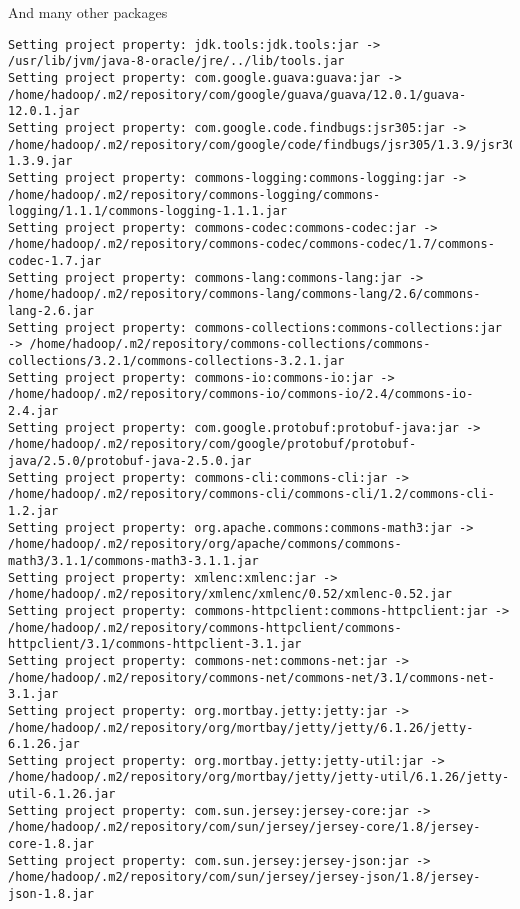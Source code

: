 And many other packages
\begin{verbatim}
Setting project property: jdk.tools:jdk.tools:jar -> /usr/lib/jvm/java-8-oracle/jre/../lib/tools.jar
Setting project property: com.google.guava:guava:jar -> /home/hadoop/.m2/repository/com/google/guava/guava/12.0.1/guava-12.0.1.jar
Setting project property: com.google.code.findbugs:jsr305:jar -> /home/hadoop/.m2/repository/com/google/code/findbugs/jsr305/1.3.9/jsr305-1.3.9.jar
Setting project property: commons-logging:commons-logging:jar -> /home/hadoop/.m2/repository/commons-logging/commons-logging/1.1.1/commons-logging-1.1.1.jar
Setting project property: commons-codec:commons-codec:jar -> /home/hadoop/.m2/repository/commons-codec/commons-codec/1.7/commons-codec-1.7.jar
Setting project property: commons-lang:commons-lang:jar -> /home/hadoop/.m2/repository/commons-lang/commons-lang/2.6/commons-lang-2.6.jar
Setting project property: commons-collections:commons-collections:jar -> /home/hadoop/.m2/repository/commons-collections/commons-collections/3.2.1/commons-collections-3.2.1.jar
Setting project property: commons-io:commons-io:jar -> /home/hadoop/.m2/repository/commons-io/commons-io/2.4/commons-io-2.4.jar
Setting project property: com.google.protobuf:protobuf-java:jar -> /home/hadoop/.m2/repository/com/google/protobuf/protobuf-java/2.5.0/protobuf-java-2.5.0.jar
Setting project property: commons-cli:commons-cli:jar -> /home/hadoop/.m2/repository/commons-cli/commons-cli/1.2/commons-cli-1.2.jar
Setting project property: org.apache.commons:commons-math3:jar -> /home/hadoop/.m2/repository/org/apache/commons/commons-math3/3.1.1/commons-math3-3.1.1.jar
Setting project property: xmlenc:xmlenc:jar -> /home/hadoop/.m2/repository/xmlenc/xmlenc/0.52/xmlenc-0.52.jar
Setting project property: commons-httpclient:commons-httpclient:jar -> /home/hadoop/.m2/repository/commons-httpclient/commons-httpclient/3.1/commons-httpclient-3.1.jar
Setting project property: commons-net:commons-net:jar -> /home/hadoop/.m2/repository/commons-net/commons-net/3.1/commons-net-3.1.jar
Setting project property: org.mortbay.jetty:jetty:jar -> /home/hadoop/.m2/repository/org/mortbay/jetty/jetty/6.1.26/jetty-6.1.26.jar
Setting project property: org.mortbay.jetty:jetty-util:jar -> /home/hadoop/.m2/repository/org/mortbay/jetty/jetty-util/6.1.26/jetty-util-6.1.26.jar
Setting project property: com.sun.jersey:jersey-core:jar -> /home/hadoop/.m2/repository/com/sun/jersey/jersey-core/1.8/jersey-core-1.8.jar
Setting project property: com.sun.jersey:jersey-json:jar -> /home/hadoop/.m2/repository/com/sun/jersey/jersey-json/1.8/jersey-json-1.8.jar

\end{verbatim}
